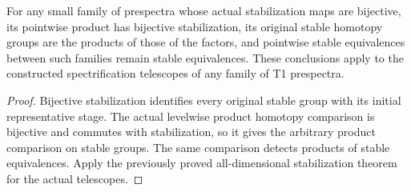\begin{proposition}
  \label{prop:actual-stabilized-arbitrary-product-groups}
  \leanok
  For any small family of prespectra whose actual stabilization maps are bijective, its pointwise product has bijective stabilization, its original stable homotopy groups are the products of those of the factors, and pointwise stable equivalences between such families remain stable equivalences. These conclusions apply to the constructed spectrification telescopes of any family of T1 prespectra.
\end{proposition}
\begin{proof}
  Bijective stabilization identifies every original stable group with its initial representative stage. The actual levelwise product homotopy comparison is bijective and commutes with stabilization, so it gives the arbitrary product comparison on stable groups. The same comparison detects products of stable equivalences. Apply the previously proved all-dimensional stabilization theorem for the actual telescopes.
  \leanok
\end{proof}

